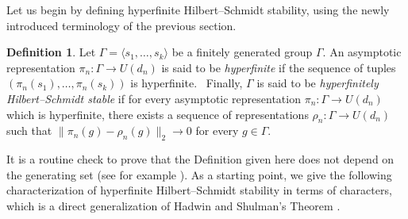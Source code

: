 \documentclass[11pt]{amsart}
\theoremstyle{definition}
\newtheorem{definition}[theorem]{Definition}
\theoremstyle{remark}
\theoremstyle{definition}
\begin{document}
Let us begin by defining hyperfinite Hilbert--Schmidt stability, using the newly introduced terminology of the previous section.

\begin{definition}\label{def:hyp_HS_stab}
    Let $\Gamma = \langle s_1, \dots, s_k \rangle$ be a finitely generated group $\Gamma$.
    An asymptotic representation $\pi_n :\Gamma \to U(d_n)$ is said to be \emph{hyperfinite} if the sequence of tuples $(\pi_n(s_1), \dots, \pi_n(s_k))$ is hyperfinite.
    \
    Finally, $\Gamma$ is said to be \emph{hyperfinitely Hilbert--Schmidt stable} if for every asymptotic representation $\pi_n : \Gamma \to U(d_n)$ which is hyperfinite, there exists a sequence of representations $\rho_n: \Gamma \to U(d_n)$ such that $\| \pi_n(g) - \rho_n(g) \|_2 \to 0$ for every $g \in \Gamma$.
\end{definition}

It is a routine check to prove that the Definition given here does not depend on the generating set (see for example \cite{Dog_Thesis}).
As a starting point, we give the following characterization of hyperfinite Hilbert--Schmidt stability in terms of characters, which is a direct generalization of Hadwin and Shulman's Theorem \cite{HS_grp}.
\end{document}
